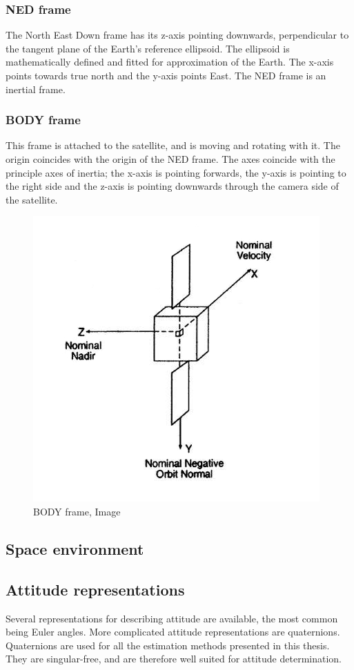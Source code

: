 \documentclass[12pt,a4paper,oneside]{article}
\begin{document}
\subsubsection{NED frame}
The North East Down frame has its z-axis pointing downwards, perpendicular to the tangent plane of the Earth’s reference ellipsoid. The ellipsoid is mathematically defined and fitted for approximation of the Earth. The x-axis points towards true north and the y-axis points East. The NED frame is an inertial frame.
\subsubsection{BODY frame}
This frame is attached to the satellite, and is moving and rotating with it. The origin coincides with the origin of the NED frame. The axes coincide with the principle axes of inertia; the x-axis is pointing forwards, the y-axis is pointing to the right side and the z-axis is pointing downwards through the camera side of the satellite.
\begin{figure}[h]
\includegraphics[scale=0.5]{body_frame.jpg}
\centering
\caption{BODY frame, Image \citet{larson1992space}}
\label{fig:body_frame}
\end{figure}
\subsection{Space environment}
\subsection{Attitude representations}
Several representations for describing attitude are available, the most common being Euler angles. More complicated attitude representations are quaternions. Quaternions are used for all the estimation methods presented in this thesis. They are singular-free, and are therefore well suited for attitude determination.
\end{document}
